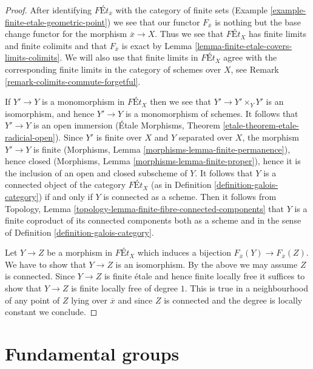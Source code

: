 \begin{proof}
After identifying $\textit{F\'Et}_{\overline{x}}$ with the category of
finite sets (Example \ref{example-finite-etale-geometric-point})
we see that our functor $F_{\overline{x}}$
is nothing but the base change functor for the morphism $\overline{x} \to X$.
Thus we see that $\textit{F\'Et}_X$ has finite limits and finite colimits
and that $F_{\overline{x}}$ is exact by
Lemma \ref{lemma-finite-etale-covers-limits-colimits}.
We will also use that finite limits in $\textit{F\'Et}_X$
agree with the corresponding finite limits in the category
of schemes over $X$, see Remark \ref{remark-colimits-commute-forgetful}.

\medskip\noindent
If $Y' \to Y$ is a monomorphism in $\textit{F\'Et}_X$
then we see that $Y' \to Y' \times_Y Y'$ is an isomorphism, and
hence $Y' \to Y$ is a monomorphism of schemes. It follows that
$Y' \to Y$ is an open immersion
(\'Etale Morphisms, Theorem \ref{etale-theorem-etale-radicial-open}). Since
$Y'$ is finite over $X$ and $Y$ separated over $X$,
the morphism $Y' \to Y$ is finite
(Morphisms, Lemma \ref{morphisms-lemma-finite-permanence}), hence closed
(Morphisms, Lemma \ref{morphisms-lemma-finite-proper}),
hence it is the inclusion of an open and closed subscheme of $Y$.
It follows that $Y$ is a connected object of the category
$\textit{F\'Et}_X$ (as in Definition \ref{definition-galois-category})
if and only if $Y$ is connected as a scheme. Then it follows from
Topology, Lemma \ref{topology-lemma-finite-fibre-connected-components}
that $Y$ is a finite coproduct of its connected components
both as a scheme and in the sense of
Definition \ref{definition-galois-category}.

\medskip\noindent
Let $Y \to Z$ be a morphism in $\textit{F\'Et}_X$ which induces a
bijection $F_{\overline{x}}(Y) \to F_{\overline{x}}(Z)$. We have to
show that $Y \to Z$ is an isomorphism. By the above we may assume
$Z$ is connected. Since $Y \to Z$ is finite \'etale and hence finite
locally free it suffices to show that $Y \to Z$ is finite locally
free of degree $1$. This is true in a neighbourhood of any point of
$Z$ lying over $\overline{x}$ and since $Z$ is connected and
the degree is locally constant we conclude.
\end{proof}



\section{Fundamental groups}
\label{section-fundamental-groups}


